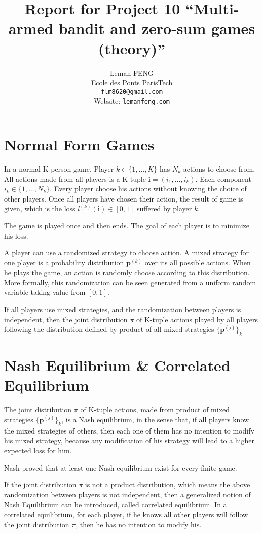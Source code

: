 \documentclass{article} %
\title{Report for Project 10 ``Multi-armed bandit and zero-sum games (theory)''}
\author{
Leman FENG \\
Ecole des Ponts ParisTech\\
\texttt{flm8620@gmail.com} \\
Website: \texttt{lemanfeng.com}
}
\begin{document}
\maketitle

\section{Normal Form Games}
In a normal K-person game, Player $k\in \{1,\dots,K\}$ has $N_k$ actions to choose from. All actions made from all players is a K-tuple $\mathbf{i} = (i_1,\dots,i_k)$. Each component $i_k\in\{1,\dots,N_k\}$. Every player choose his actions without knowing the choice of other players. Once all players have chosen their action, the result of game is given, which is the loss $l^{(k)}(\mathbf{i})\in[0,1]$ suffered by player $k$.

The game is played once and then ends. The goal of each player is to minimize his loss.

A player can use a randomized strategy to choose action. A mixed strategy for one player is a probability distribution $\mathbf{p}^{(k)}$ over its all possible actions. When he plays the game, an action is randomly choose according to this distribution. More formally, this randomization can be seen generated from a uniform random variable taking value from $[0,1]$. 

If all players use mixed strategies, and the randomization between players is independent, then the joint distribution $\pi$ of K-tuple actions played by all players following the distribution defined by product of all mixed strategies $\{\mathbf{p}^{(j)}\}_k$

\section{Nash Equilibrium \& Correlated Equilibrium}
The joint distribution $\pi$ of K-tuple actions, made from product of mixed strategies $\{\mathbf{p}^{(j)}\}_k$, is a Nash equilibrium, in the sense that, if all players know the mixed strategies of others, then each one of them has no intention to modify his mixed strategy, because any modification of his strategy will lead to a higher expected loss for him.

Nash proved that at least one Nash equilibrium exist for every finite game.

If the joint distribution $\pi$ is not a product distribution, which means the above randomization between players is not independent, then a generalized notion of Nash Equilibrium can be introduced, called correlated equilibrium. In a correlated equilibrium, for each player, if he knows all other players will follow the joint distribution $\pi$, then he has no intention to modify his.
\end{document}

